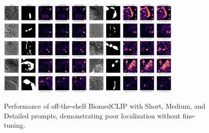 \documentclass[./dissertation.tex]{subfiles}
\begin{document}
\begin{figure}
    \centering
    \includegraphics[width=0.4\textwidth]{figures/sam/untuned garbage results.png}
    \includegraphics[width=0.4\textwidth]{figures/sam/untuned short med long.png} %
    \caption{Performance of off-the-shelf BiomedCLIP with Short, Medium, and Detailed prompts, demonstrating poor localization without fine-tuning.}
    \label{fig:untuned_garbage_results}
\end{figure}
\end{document}
